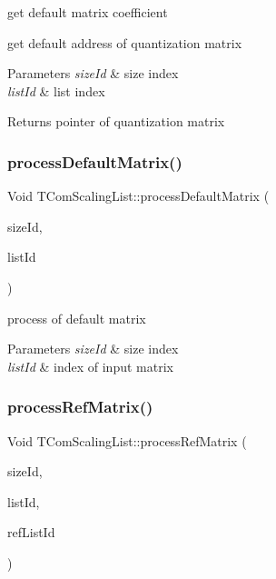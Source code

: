 get default matrix coefficient 

get default address of quantization matrix 
\begin{DoxyParams}{Parameters}
{\em size\+Id} & size index \\
\hline
{\em list\+Id} & list index \\
\hline
\end{DoxyParams}
\begin{DoxyReturn}{Returns}
pointer of quantization matrix 
\end{DoxyReturn}
\mbox{\label{class_t_com_scaling_list_a97e70eaa265724a81a202c2a38b9d879}} 
\subsubsection{\texorpdfstring{process\+Default\+Matrix()}{processDefaultMatrix()}}
{\footnotesize\ttfamily Void T\+Com\+Scaling\+List\+::process\+Default\+Matrix (\begin{DoxyParamCaption}\item[{U\+Int}]{size\+Id,  }\item[{U\+Int}]{list\+Id }\end{DoxyParamCaption})}

process of default matrix 
\begin{DoxyParams}{Parameters}
{\em size\+Id} & size index \\
\hline
{\em list\+Id} & index of input matrix \\
\hline
\end{DoxyParams}
\mbox{\label{class_t_com_scaling_list_a92e63bd00c7c2645debc8ea87b8671f1}} 
\subsubsection{\texorpdfstring{process\+Ref\+Matrix()}{processRefMatrix()}}
{\footnotesize\ttfamily Void T\+Com\+Scaling\+List\+::process\+Ref\+Matrix (\begin{DoxyParamCaption}\item[{U\+Int}]{size\+Id,  }\item[{U\+Int}]{list\+Id,  }\item[{U\+Int}]{ref\+List\+Id }\end{DoxyParamCaption})}

